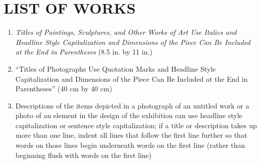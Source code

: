 \clearpage
\part{LIST OF WORKS}
\singlespacing

\begin{enumerate}[align=left,itemindent=-.3in,leftmargin=.7in]
	\item \textit{Titles of Paintings, Sculptures, and Other Works of Art Use Italics and Headline Style Capitalization and Dimensions of the Piece Can Be Included at the End in Parentheses} (8.5 in. by 11 in.)
	\item ``Titles of Photographs Use Quotation Marks and Headline Style Capitalization and Dimensions of the Piece Can Be Included at the End in Parentheses'' (40 cm by 40 cm)
	\item Descriptions of the items depicted in a photograph of an untitled work or a photo of an element in the design of the exhibition can use headline style capitalization or sentence style capitalization; if a title or description takes up 	more than one line, indent all lines that follow the first line further so that words on those lines begin underneath words on the first line (rather than 	beginning flush with words on the first line)
\end{enumerate}


\doublespacing
\clearpage